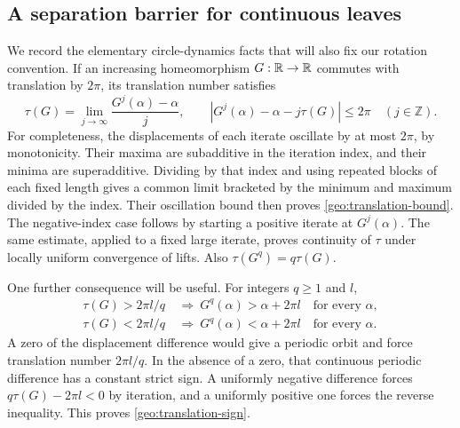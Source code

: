 \subsection{A separation barrier for continuous leaves}

We record the elementary circle-dynamics facts that will also fix our
rotation convention.  If an increasing homeomorphism $G:\mathbb{R}\to\mathbb{R}$
commutes with translation by $2\pi$, its translation number satisfies
\begin{equation}\label{geo:translation-bound}
 \tau(G)=\lim_{j\to\infty}\frac{G^j(\alpha)-\alpha}{j},
 \qquad
 |G^j(\alpha)-\alpha-j\tau(G)|\le2\pi
 \quad (j\in\mathbb Z).
\end{equation}
For completeness, the displacements of each iterate oscillate by at most
$2\pi$, by monotonicity.  Their maxima are subadditive in the iteration
index, and their minima are superadditive.  Dividing by that index and
using repeated blocks of each fixed length gives a common limit bracketed
by the minimum and maximum divided by the index.  Their oscillation bound
then proves \eqref{geo:translation-bound}.  The negative-index case
follows by starting a positive iterate at $G^j(\alpha)$.
The same estimate, applied to a fixed large iterate, proves continuity of
$\tau$ under locally uniform convergence of lifts.  Also
$\tau(G^q)=q\tau(G)$.

One further consequence will be useful.  For integers $q\ge1$ and $l$,
\begin{equation}\label{geo:translation-sign}
 \begin{aligned}
 \tau(G)>2\pi l/q&\ \Longrightarrow\
              G^q(\alpha)>\alpha+2\pi l\quad\text{for every }\alpha,\\
 \tau(G)<2\pi l/q&\ \Longrightarrow\
              G^q(\alpha)<\alpha+2\pi l\quad\text{for every }\alpha.
 \end{aligned}
\end{equation}
A zero of the displacement difference would give a periodic orbit and
force translation number $2\pi l/q$.  In the absence of a zero, that
continuous periodic difference has a constant strict sign.  A uniformly
negative difference forces $q\tau(G)-2\pi l<0$ by iteration, and a
uniformly positive one forces the reverse inequality.  This proves
\eqref{geo:translation-sign}.

